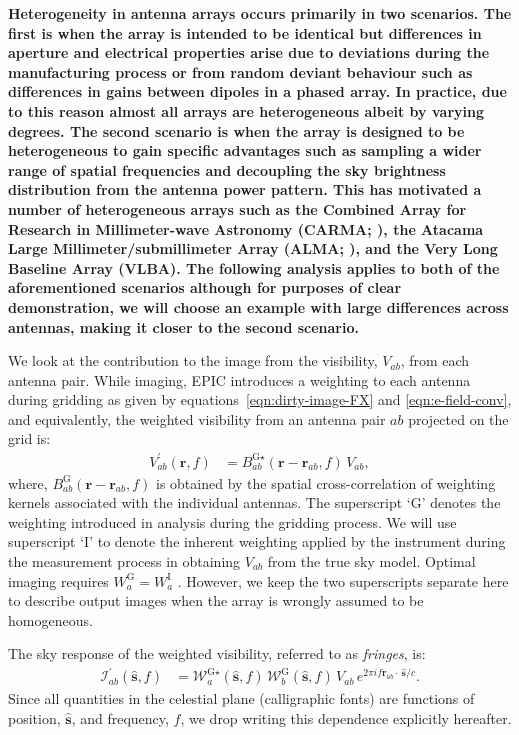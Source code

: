 \documentclass[a4paper,fleqn,usenatbib]{mnras}
\begin{document}
{\bf Heterogeneity in antenna arrays occurs primarily in two scenarios. The first is when the array is intended to be identical but differences in aperture and electrical properties arise due to deviations during the manufacturing process or from random deviant behaviour such as differences in gains between dipoles in a phased array. In practice, due to this reason almost all arrays are heterogeneous albeit by varying degrees. The second scenario is when the array is designed to be heterogeneous to gain specific advantages such as sampling a wider range of spatial frequencies and decoupling the sky brightness distribution from the antenna power pattern. This has motivated a number of heterogeneous arrays such as the Combined Array for Research in Millimeter-wave Astronomy (CARMA; \citealt{woo04,wri10}), the Atacama Large Millimeter/submillimeter Array (ALMA; \citealt{igu09}), and the Very Long Baseline Array (VLBA). The following analysis applies to both of the aforementioned scenarios although for purposes of clear demonstration, we will choose an example with large differences across antennas, making it closer to the second scenario.}

We look at the contribution to the image from the visibility, $V_{ab}$, from each antenna pair. While imaging, EPIC introduces a weighting to each antenna during gridding as given by equations~\ref{eqn:dirty-image-FX} and \ref{eqn:e-field-conv}, and equivalently, the weighted visibility from an antenna pair $ab$ projected on the grid is:
\begin{align}
  V^\prime_{ab}(\mathbf{r},f) &= B^{\textrm{G}\star}_{ab}(\mathbf{r}-\mathbf{r}_{ab},f)\,V_{ab},
\end{align}
where, $B^\textrm{G}_{ab}(\mathbf{r}-\mathbf{r}_{ab},f)$ is obtained by the spatial cross-correlation of weighting kernels associated with the individual antennas. The superscript `$\textrm{G}$' denotes the weighting introduced in analysis during the gridding process. We will use superscript `I' to denote the inherent weighting applied by the instrument during the measurement process in obtaining $V_{ab}$ from the true sky model. Optimal imaging requires $W^\textrm{G}_a = W^\textrm{I}_a$ \citep{mor09,mor11}. However, we keep the two superscripts separate here to describe output images when the array is wrongly assumed to be homogeneous.

The sky response of the weighted visibility, referred to as {\it fringes}, is:
\begin{align}
  \mathcal{I}^\prime_{ab}(\hat{\mathbf{s}},f) &= \mathcal{W}^{\textrm{G}\star}_a(\hat{\mathbf{s}},f)\,\mathcal{W}^\textrm{G}_b(\hat{\mathbf{s}},f)\,V_{ab}\,e^{2\pi i f\mathbf{r}_{ab}\!\cdot\,\hat{\mathbf{s}}/c}.
\end{align}
Since all quantities in the celestial plane (calligraphic fonts) are functions of position, $\hat{\mathbf{s}}$, and frequency, $f$, we drop writing this dependence explicitly hereafter.
\end{document}
